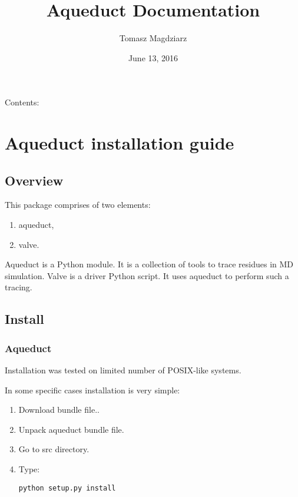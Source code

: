 \documentclass[a4paper,10pt,english]{sphinxmanual}
\title{Aqueduct Documentation}
\date{June 13, 2016}
\author{Tomasz Magdziarz}
\begin{document}
\maketitle
\tableofcontents
{}\label{index::doc}


Contents:


\chapter{Aqueduct installation guide}
\label{aqueduct_install:welcome-to-aqueduct-s-documentation}\label{aqueduct_install::doc}\label{aqueduct_install:aqueduct-installation-guide}

\section{Overview}
\label{aqueduct_install:overview}
This package comprises of two elements:
\begin{enumerate}
\item {} 
aqueduct,

\item {} 
valve.

\end{enumerate}

Aqueduct is a Python module. It is a collection of tools to trace residues in MD simulation. Valve is a driver Python script. It uses aqueduct to perform such a tracing.


\section{Install}
\label{aqueduct_install:install}

\subsection{Aqueduct}
\label{aqueduct_install:aqueduct}
Installation was tested on limited number of POSIX-like systems.

In some specific cases installation is very simple:
\begin{enumerate}
\item {} 
Download  bundle file..

\item {} 
Unpack aqueduct bundle file.

\item {} 
Go to src directory.

\item {} 
Type:

\begin{Verbatim}[commandchars=\\\{\}]
python setup.py install
\end{Verbatim}

\end{enumerate}
\end{document}
